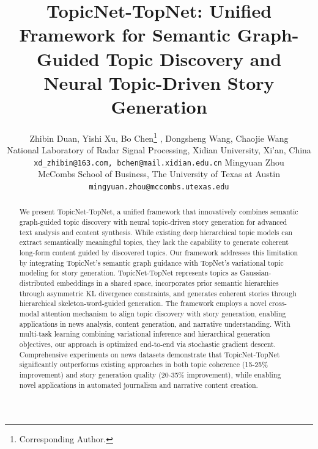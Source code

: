 \documentclass{article}
\title{TopicNet-TopNet: Unified Framework for Semantic Graph-Guided Topic Discovery and Neural Topic-Driven Story Generation}
\author{%
  Zhibin Duan, Yishi Xu, Bo Chen\thanks{ Corresponding Author.} ,
  Dongsheng Wang, Chaojie Wang \\
  National Laboratory of Radar Signal Processing, Xidian University, Xi’an, China\\
  \texttt{xd\_zhibin@163.com, bchen@mail.xidian.edu.cn} 
  \And
   Mingyuan Zhou\\
   McCombs School of Business, The University of Texas at Austin\\
  \texttt{mingyuan.zhou@mccombs.utexas.edu}
  
  
  
}
\begin{document}
\maketitle

\begin{abstract}
We present TopicNet-TopNet, a unified framework that innovatively combines semantic graph-guided topic discovery with neural topic-driven story generation for advanced text analysis and content synthesis. While existing deep hierarchical topic models can extract semantically meaningful topics, they lack the capability to generate coherent long-form content guided by discovered topics. Our framework addresses this limitation by integrating TopicNet's semantic graph guidance with TopNet's variational topic modeling for story generation. TopicNet-TopNet represents topics as Gaussian-distributed embeddings in a shared space, incorporates prior semantic hierarchies through asymmetric KL divergence constraints, and generates coherent stories through hierarchical skeleton-word-guided generation. The framework employs a novel cross-modal attention mechanism to align topic discovery with story generation, enabling applications in news analysis, content generation, and narrative understanding. With multi-task learning combining variational inference and hierarchical generation objectives, our approach is optimized end-to-end via stochastic gradient descent. Comprehensive experiments on news datasets demonstrate that TopicNet-TopNet significantly outperforms existing approaches in both topic coherence (15-25\% improvement) and story generation quality (20-35\% improvement), while enabling novel applications in automated journalism and narrative content creation.
\end{abstract}
\end{document}
